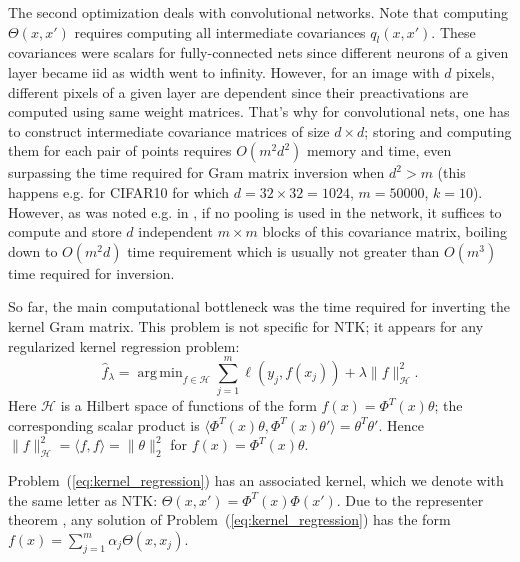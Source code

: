 \documentclass{article}
\newcommand{\HH}{\mathcal{H}}
\DeclareMathOperator*{\argmin}{arg\,min}
\begin{document}
    The second optimization deals with convolutional networks.
    Note that computing $\Theta(x,x')$ requires computing all intermediate covariances $q_l(x,x')$.
    These covariances were scalars for fully-connected nets since different neurons of a given layer became iid as width went to infinity.
    However, for an image with $d$ pixels, different pixels of a given layer are dependent since their preactivations are computed using same weight matrices.
    That's why for convolutional nets, one has to construct intermediate covariance matrices of size $d \times d$; storing and computing them for each pair of points requires $O(m^2 d^2)$ memory and time, even surpassing the time required for Gram matrix inversion when $d^2 > m$ (this happens e.g. for CIFAR10 for which $d = 32 \times 32 = 1024$, $m = 50 000$, $k = 10$).
    However, as was noted e.g. in \cite{xiao2018dynamical}, if no pooling is used in the network, it suffices to compute and store $d$ independent $m \times m$ blocks of this covariance matrix, boiling down to $O(m^2 d)$ time requirement which is usually not greater than $O(m^3)$ time required for inversion.

    So far, the main computational bottleneck was the time required for inverting the kernel Gram matrix.
    This problem is not specific for NTK; it appears for any regularized kernel regression problem:
    \begin{equation}
        \hat f_\lambda
        = \argmin_{f \in \HH} \sum_{j=1}^m \ell(y_j, f(x_j)) + \lambda \| f \|_\HH^2.
        \label{eq:kernel_regression}
    \end{equation}
    Here $\HH$ is a Hilbert space of functions of the form $f(x) = \Phi^T(x) \theta$; the corresponding scalar product is $\langle \Phi^T(x) \theta, \Phi^T(x) \theta' \rangle = \theta^T \theta'$.
    Hence $\| f \|_\HH^2 = \langle f, f \rangle = \|\theta\|_2^2$ for $f(x) = \Phi^T(x) \theta$.

    Problem~(\ref{eq:kernel_regression}) has an associated kernel, which we denote with the same letter as NTK: $\Theta(x,x') = \Phi^T(x) \Phi(x')$.
    Due to the representer theorem \cite{kimeldorf1970correspondence}, any solution of Problem~(\ref{eq:kernel_regression}) has the form $f(x) = \sum_{j=1}^m \alpha_j \Theta(x,x_j)$.
    
\end{document}
